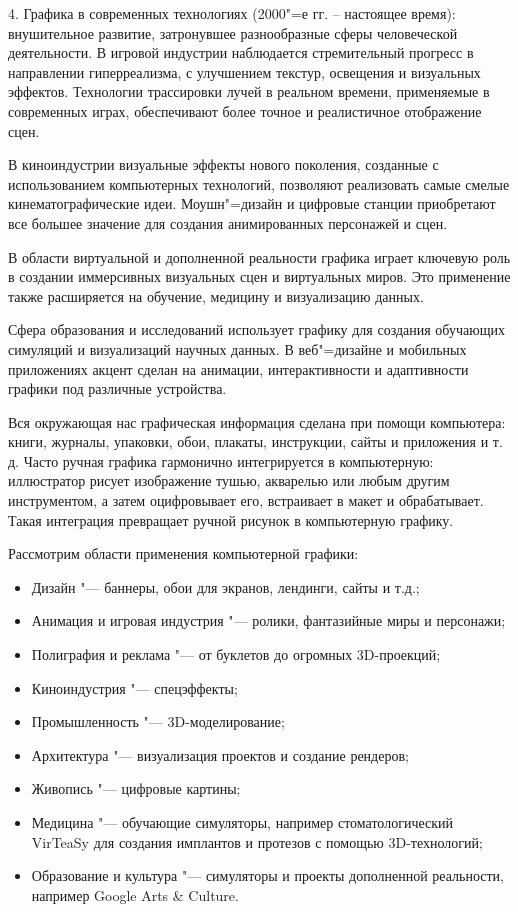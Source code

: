 4. Графика в современных технологиях (2000"=е гг. -- настоящее время): внушительное развитие, затронувшее разнообразные сферы человеческой деятельности. В игровой индустрии наблюдается стремительный прогресс в направлении гиперреализма, с улучшением текстур, освещения и визуальных эффектов. Технологии трассировки лучей в реальном времени, применяемые в современных играх, обеспечивают более точное и реалистичное отображение сцен.

В киноиндустрии визуальные эффекты нового поколения, созданные с использованием компьютерных технологий, позволяют реализовать самые смелые кинематографические идеи. Моушн"=дизайн и цифровые станции приобретают все большее значение для создания анимированных персонажей и сцен.

В области виртуальной и дополненной реальности графика играет ключевую роль в создании иммерсивных визуальных сцен и виртуальных миров. Это применение также расширяется на обучение, медицину и визуализацию данных.

Сфера образования и исследований использует графику для создания обучающих симуляций и визуализаций научных данных. В веб"=дизайне и мобильных приложениях акцент сделан на анимации, интерактивности и адаптивности графики под различные устройства.

Вся окружающая нас графическая информация сделана при помощи компьютера: книги, журналы, упаковки, обои, плакаты, инструкции, сайты и приложения и т. д. Часто ручная графика гармонично интегрируется в компьютерную: иллюстратор рисует изображение тушью, акварелью или любым другим инструментом, а затем оцифровывает его, встраивает в макет и обрабатывает. Такая интеграция превращает ручной рисунок в компьютерную графику.

Рассмотрим области применения компьютерной графики:
\begin{itemize}
    \item Дизайн "--- баннеры, обои для экранов, лендинги, сайты и т.д.; 
    \item Анимация и игровая индустрия "--- ролики, фантазийные миры и персонажи;
    \item Полиграфия и реклама "--- от буклетов до огромных 3D-проекций;  
    \item Киноиндустрия "--- спецэффекты;
    \item Промышленность "--- 3D-моделирование;  
    \item Архитектура "--- визуализация проектов и создание рендеров;
    \item Живопись "--- цифровые картины;
    \item Медицина "--- обучающие симуляторы, например стоматологический \\ VirTeaSy для создания имплантов и протезов с помощью 3D-технологий;   
    \item Образование и культура "--- симуляторы и проекты дополненной реальности, например Google Arts \& Culture.
\end{itemize}